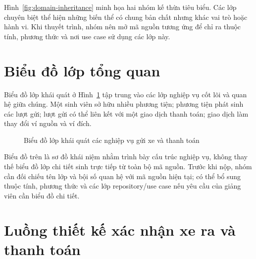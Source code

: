 Hình~\ref{fig:domain-inheritance} minh họa hai nhóm kế thừa tiêu biểu. Các lớp chuyên biệt thể hiện những biến thể có chung bản chất nhưng khác vai trò hoặc hành vi. Khi thuyết trình, nhóm nên mở mã nguồn tương ứng để chỉ ra thuộc tính, phương thức và nơi use case sử dụng các lớp này.

\section{Biểu đồ lớp tổng quan}

Biểu đồ lớp khái quát ở Hình~\ref{fig:class-overview} tập trung vào các lớp nghiệp vụ cốt lõi và quan hệ giữa chúng. Một sinh viên sở hữu nhiều phương tiện; phương tiện phát sinh các lượt gửi; lượt gửi có thể liên kết với một giao dịch thanh toán; giao dịch làm thay đổi ví nguồn và ví đích.

\begin{figure}[htbp]
\centering
{}
\caption{Biểu đồ lớp khái quát các nghiệp vụ gửi xe và thanh toán}
\label{fig:class-overview}
\end{figure}

Biểu đồ trên là sơ đồ khái niệm nhằm trình bày cấu trúc nghiệp vụ, không thay thế biểu đồ lớp chi tiết sinh trực tiếp từ toàn bộ mã nguồn. Trước khi nộp, nhóm cần đối chiếu tên lớp và bội số quan hệ với mã nguồn hiện tại; có thể bổ sung thuộc tính, phương thức và các lớp repository/use case nếu yêu cầu của giảng viên cần biểu đồ chi tiết.

\section{Luồng thiết kế xác nhận xe ra và thanh toán}

